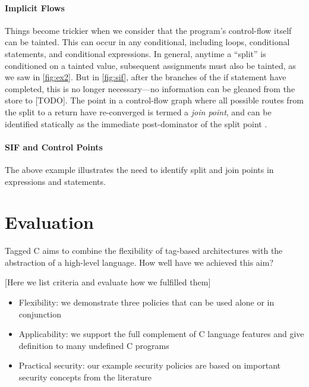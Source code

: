 \documentclass{llncs}
\begin{document}
\paragraph*{Implicit Flows}

Things become trickier when we consider that the program's control-flow itself can be tainted.
This can occur in any conditional, including loops, conditional statements, and conditional expressions.
In general, anytime a ``split'' is conditioned on a tainted value, subsequent assignments must also be
tainted, as we saw in \cref{fig:ex2}. But in \cref{fig:sif}, after the branches of the
if statement have completed, this is no longer necessary---no information can be gleaned
from the store to [TODO]. The point in a control-flow graph where all possible routes
from the split to a return have re-converged is termed a {\em join point}, and can be identified
statically as the immediate post-dominator of the split point \cite{Denning77:SecureInformationFlow}.

\paragraph*{SIF and Control Points}

The above example illustrates the need to identify split and join points in expressions
and statements.

\section{Evaluation}
\label{sec:evaluation}

Tagged C aims to combine the flexibility of tag-based architectures with the abstraction
of a high-level language. How well have we achieved this aim?

[Here we list criteria and evaluate how we fulfilled them]

\begin{itemize}
\item Flexibility: we demonstrate three policies that can be used alone or in conjunction
\item Applicability: we support the full complement of C language features and give definition
  to many undefined C programs
\item Practical security: our example security policies are based on important security concepts
  from the literature
\end{itemize}
\end{document}
